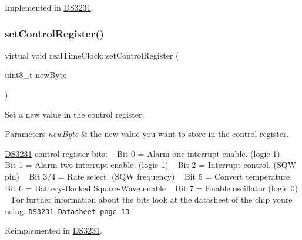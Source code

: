 Implemented in \mbox{\hyperlink{class_d_s3231_ae294f3c8c8634a058846cf9864ccc5c8}{D\+S3231}}.

\mbox{\label{classreal_time_clock_ab4034ba75fb65a55fb725c37e89f7626}} 
\subsubsection{\texorpdfstring{set\+Control\+Register()}{setControlRegister()}}
{\footnotesize\ttfamily virtual void real\+Time\+Clock\+::set\+Control\+Register (\begin{DoxyParamCaption}\item[{uint8\+\_\+t}]{new\+Byte }\end{DoxyParamCaption})\hspace{0.3cm}{\ttfamily [virtual]}}



Set a new value in the control register. 


\begin{DoxyParams}{Parameters}
{\em new\+Byte} & the new value you want to store in the control register.\\
\hline
\end{DoxyParams}
\mbox{\hyperlink{class_d_s3231}{D\+S3231}} control register bits\+: ~\newline
 Bit 0 = Alarm one interrupt enable. (logic 1) ~\newline
 Bit 1 = Alarm two interrupt enable. (logic 1) ~\newline
 Bit 2 = Interrupt control. (S\+QW pin) ~\newline
 Bit 3/4 = Rate select. (S\+QW frequency) ~\newline
 Bit 5 = Convert temperature. ~\newline
 Bit 6 = Battery-\/\+Backed Square-\/\+Wave enable ~\newline
 Bit 7 = Enable oscillator (logic 0) ~\newline
 For further information about the bits look at the datasheet of the chip you\textquotesingle{}re using. \href{https://datasheets.maximintegrated.com/en/ds/DS3231.pdf}{\tt D\+S3231 Datasheet page 13} 

Reimplemented in \mbox{\hyperlink{class_d_s3231_a1151a22a8dd47470b22562cedae114e9}{D\+S3231}}.

